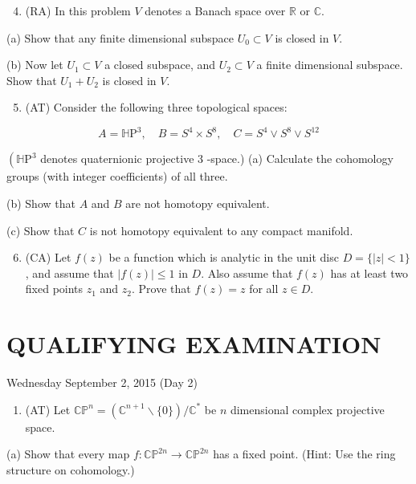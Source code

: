\documentclass[10pt]{article}
\begin{document}
\begin{enumerate}
  \setcounter{enumi}{3}
  \item (RA) In this problem $V$ denotes a Banach space over $\mathbb{R}$ or $\mathbb{C}$.
\end{enumerate}

(a) Show that any finite dimensional subspace $U_{0} \subset V$ is closed in $V$.

(b) Now let $U_{1} \subset V$ a closed subspace, and $U_{2} \subset V$ a finite dimensional subspace. Show that $U_{1}+U_{2}$ is closed in $V$.

\begin{enumerate}
  \setcounter{enumi}{4}
  \item (AT) Consider the following three topological spaces:
\end{enumerate}

$$
A=\mathbb{H} \mathrm{P}^{3}, \quad B=S^{4} \times S^{8}, \quad C=S^{4} \vee S^{8} \vee S^{12}
$$

$\left(\mathbb{H} \mathrm{P}^{3}\right.$ denotes quaternionic projective 3 -space.)
(a) Calculate the cohomology groups (with integer coefficients) of all three.

(b) Show that $A$ and $B$ are not homotopy equivalent.

(c) Show that $C$ is not homotopy equivalent to any compact manifold.

\begin{enumerate}
  \setcounter{enumi}{5}
  \item (CA) Let $f(z)$ be a function which is analytic in the unit disc $D=\{|z|<1\}$, and assume that $|f(z)| \leq 1$ in $D$. Also assume that $f(z)$ has at least two fixed points $z_{1}$ and $z_{2}$. Prove that $f(z)=z$ for all $z \in D$.
\end{enumerate}

\section*{QUALIFYING EXAMINATION }
Wednesday September 2, 2015 (Day 2)

\begin{enumerate}
  \item (AT) Let $\mathbb{C P}^{n}=\left(\mathbb{C}^{n+1} \backslash\{0\}\right) / \mathbb{C}^{*}$ be $n$ dimensional complex projective space.
\end{enumerate}

(a) Show that every map $f: \mathbb{C P}^{2 n} \rightarrow \mathbb{C P}^{2 n}$ has a fixed point. (Hint: Use the ring structure on cohomology.)
\end{document}
